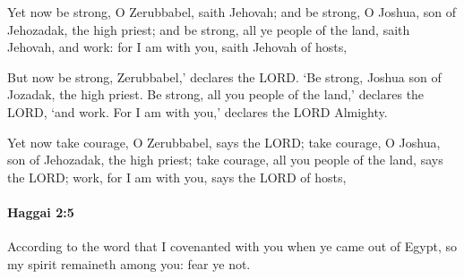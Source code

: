 			\begin{versebox}
					\item[BHS] 
					\item[LXX] 
					\item[ASV] Yet now be strong, O Zerubbabel, saith Jehovah; and be strong, O Joshua, son of Jehozadak, the high priest; and be strong, all ye people of the land, saith Jehovah, and work: for I am with you, saith Jehovah of hosts,
					\item[NIV] But now be strong, Zerubbabel,’ declares the LORD. ‘Be strong, Joshua son of Jozadak, the high priest. Be strong, all you people of the land,’ declares the LORD, ‘and work. For I am with you,’ declares the LORD Almighty.
					\item[NRSV] Yet now take courage, O Zerubbabel, says the LORD; take courage, O Joshua, son of Jehozadak, the high priest; take courage, all you people of the land, says the LORD; work, for I am with you, says the LORD of hosts,
			\end{versebox}

		\paragraph{Haggai 2:5} %
			\label{HAGGAI-2-5}

			According to the word that I covenanted with you when ye came out of Egypt, so my spirit remaineth among you: fear ye not.

